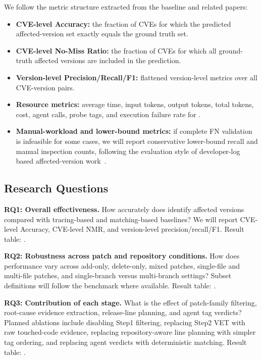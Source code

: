 We follow the metric structure extracted from the baseline and related papers:
\begin{itemize}[leftmargin=*]
  \item \textbf{CVE-level Accuracy:} the fraction of CVEs for which the predicted affected-version set exactly equals the ground truth set.
  \item \textbf{CVE-level No-Miss Ratio:} the fraction of CVEs for which all ground-truth affected versions are included in the prediction.
  \item \textbf{Version-level Precision/Recall/F1:} flattened version-level metrics over all CVE-version pairs.
  \item \textbf{Resource metrics:} average time, input tokens, output tokens, total tokens, cost, agent calls, probe tags, and execution failure rate for \toolname {}.
  \item \textbf{Manual-workload and lower-bound metrics:} if complete FN validation is infeasible for some cases, we will report conservative lower-bound recall and manual inspection counts, following the evaluation style of developer-log based affected-version work~\cite{tdsc2024}.
\end{itemize}



\subsection{Research Questions}

\textbf{RQ1: Overall effectiveness.} How accurately does \toolname identify affected versions compared with tracing-based and matching-based baselines? We will report CVE-level Accuracy, CVE-level NMR, and version-level precision/recall/F1. Result table: .

\textbf{RQ2: Robustness across patch and repository conditions.} How does performance vary across add-only, delete-only, mixed patches, single-file and multi-file patches, and single-branch versus multi-branch settings? Subset definitions will follow the benchmark where available. Result table: .

\textbf{RQ3: Contribution of each \toolname stage.} What is the effect of patch-family filtering, root-cause evidence extraction, release-line planning, and agent tag verdicts? Planned ablations include disabling Step1 filtering, replacing Step2 VET with raw touched-code evidence, replacing repository-aware line planning with simpler tag ordering, and replacing agent verdicts with deterministic matching. Result table: .

